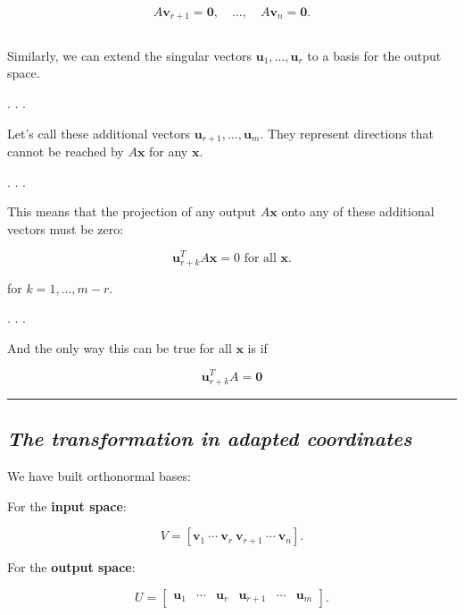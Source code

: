 \documentclass[
  letterpaper,
  DIV=11,
  numbers=noendperiod]{scrartcl}
\begin{document}
\[
A\mathbf{v}_{r+1} = \mathbf{0}, \quad \dots, \quad A\mathbf{v}_n = \mathbf{0}.
\]

\subsection{\texorpdfstring{\emph{}}{}}\label{section-3}

Similarly, we can extend the singular vectors
\(\mathbf{u}_1,\dots,\mathbf{u}_r\) to a basis for the output space.

. . .

Let's call these additional vectors
\(\mathbf{u}_{r+1},\dots,\mathbf{u}_m\). They represent directions that
cannot be reached by \(A\mathbf{x}\) for any \(\mathbf{x}\).

. . .

This means that the projection of any output \(A\mathbf{x}\) onto any of
these additional vectors must be zero:

\[
\mathbf{u}_{r+k}^T A\mathbf{x} = 0 \text{ for all } \mathbf{x}.
\]

for \(k = 1, \dots, m - r\).

. . .

And the only way this can be true for all \(\mathbf{x}\) is if

\[
\mathbf{u}_{r+k}^T A = \mathbf{0}
\]

\begin{center}\rule{0.5\linewidth}{0.5pt}\end{center}

\subsection{\texorpdfstring{\emph{The transformation in adapted
coordinates}}{The transformation in adapted coordinates}}\label{the-transformation-in-adapted-coordinates}

We have built orthonormal bases:

For the \textbf{input space}:

\[
V = [\mathbf{v}_1\ \cdots\ \mathbf{v}_r\ \mathbf{v}_{r+1}\ \cdots\ \mathbf{v}_n].
\]

For the \textbf{output space}:

\[
  U =
  \begin{bmatrix}
  \mathbf u_1 & \cdots & \mathbf u_r & \mathbf u_{r+1} & \cdots & \mathbf u_m
  \end{bmatrix}.
  \]

\subsection{\texorpdfstring{\emph{}}{}}\label{section-4}
\end{document}
